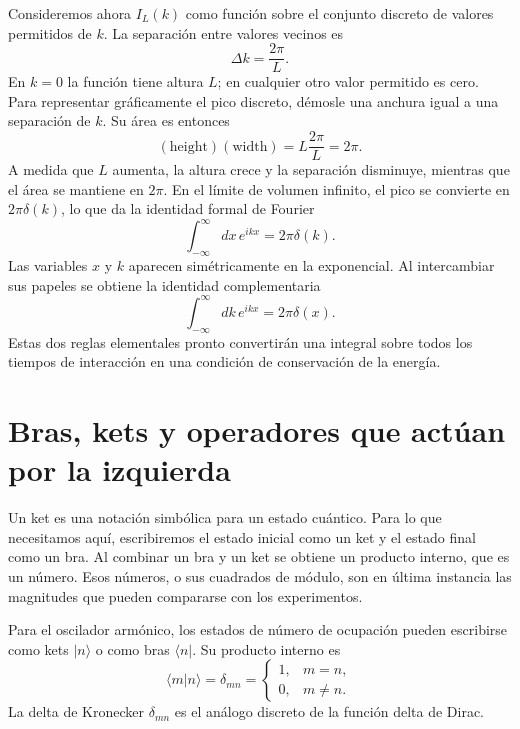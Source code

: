 Consideremos ahora \(I_L(k)\) como función sobre el conjunto discreto de valores permitidos de \(k\). La separación entre valores vecinos es
\begin{equation}
\Delta k=\frac{2\pi}{L}.
\end{equation}
En \(k=0\) la función tiene altura \(L\); en cualquier otro valor permitido es cero. Para representar gráficamente el pico discreto, démosle una anchura igual a una separación de \(k\). Su área es entonces
\begin{equation}
(\text{height})(\text{width})
=L\frac{2\pi}{L}=2\pi.
\end{equation}
A medida que \(L\) aumenta, la altura crece y la separación disminuye, mientras que el área se mantiene en \(2\pi\). En el límite de volumen infinito, el pico se convierte en \(2\pi\delta(k)\), lo que da la identidad formal de Fourier
\begin{equation}
\int_{-\infty}^{\infty}dx\,e^{ikx}=2\pi\delta(k).
\end{equation}
Las variables \(x\) y \(k\) aparecen simétricamente en la exponencial. Al intercambiar sus papeles se obtiene la identidad complementaria
\begin{equation}
\int_{-\infty}^{\infty}dk\,e^{ikx}=2\pi\delta(x).
\end{equation}
Estas dos reglas elementales pronto convertirán una integral sobre todos los tiempos de interacción en una condición de conservación de la energía.

\section{Bras, kets y operadores que actúan por la izquierda}

Un ket es una notación simbólica para un estado cuántico. Para lo que necesitamos aquí, escribiremos el estado inicial como un ket y el estado final como un bra. Al combinar un bra y un ket se obtiene un producto interno, que es un número. Esos números, o sus cuadrados de módulo, son en última instancia las magnitudes que pueden compararse con los experimentos.

\begin{classroomqa}\end{classroomqa}

Para el oscilador armónico, los estados de número de ocupación pueden escribirse como kets \(\lvert n\rangle\) o como bras \(\langle n\rvert\). Su producto interno es
\begin{equation}
\langle m\vert n\rangle=\delta_{mn}
=\begin{cases}
1,&m=n,\\
0,&m\neq n.
\end{cases}
\end{equation}
La delta de Kronecker \(\delta_{mn}\) es el análogo discreto de la función delta de Dirac.

